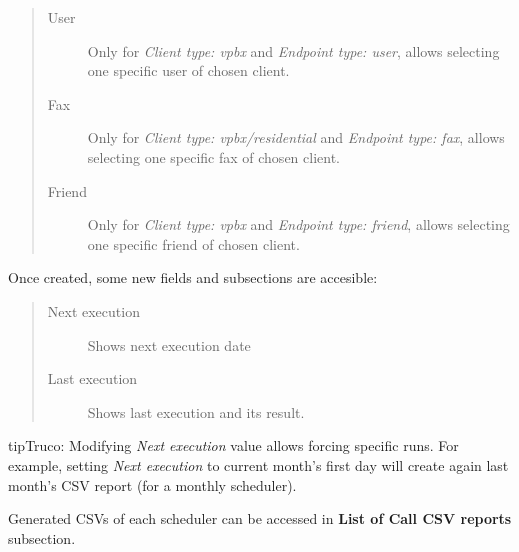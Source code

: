 \documentclass[letterpaper,10pt,spanish]{sphinxmanual}
\begin{document}
\begin{quote}
\begin{description}
\item[{User}] \leavevmode
Only for \emph{Client type: vpbx} and \emph{Endpoint type: user}, allows selecting one specific user of chosen client.

\item[{Fax}] \leavevmode
Only for \emph{Client type: vpbx/residential} and \emph{Endpoint type: fax}, allows selecting one specific fax of chosen client.

\item[{Friend}] \leavevmode
Only for \emph{Client type: vpbx} and \emph{Endpoint type: friend}, allows selecting one specific friend of chosen client.

\end{description}
\end{quote}

Once created, some new fields and subsections are accesible:
\begin{quote}
\begin{description}
\item[{Next execution}] \leavevmode
Shows next execution date

\item[{Last execution}] \leavevmode
Shows last execution and its result.

\end{description}
\end{quote}

\begin{notice}{tip}{Truco:}
Modifying \emph{Next execution} value allows forcing specific runs. For example, setting \emph{Next execution} to
current month's first day will create again last month's CSV report (for a monthly scheduler).
\end{notice}

Generated CSVs of each scheduler can be accessed in \textbf{List of Call CSV reports} subsection.
\end{document}

